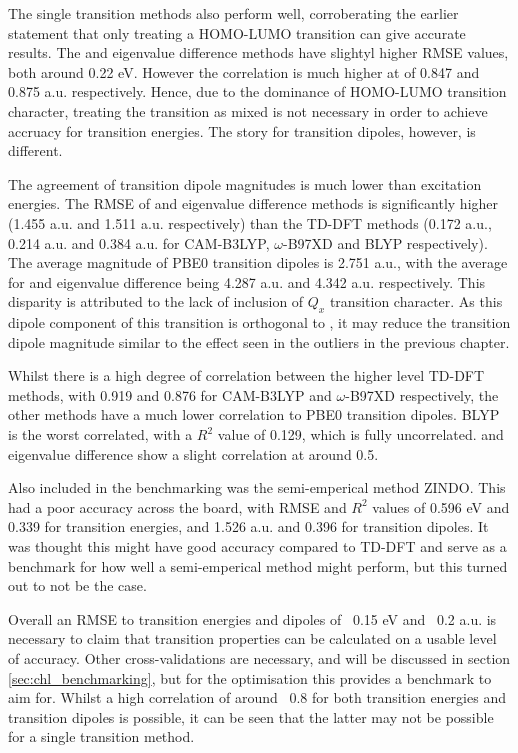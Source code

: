 The single transition methods also perform well, corroberating the earlier statement
that only treating a HOMO-LUMO transition can give accurate results. The \dscf and
eigenvalue difference methods have slightyl higher RMSE values, both around 0.22 eV.
However the correlation is much higher at of 0.847 and 0.875 a.u. respectively.
Hence, due to the dominance of HOMO-LUMO transition character, treating the transition
as mixed is not necessary in order to achieve accruacy for transition energies. 
The story for transition dipoles, however, is different.

The agreement of transition dipole magnitudes is much lower than excitation energies.
The RMSE of \dscf and eigenvalue difference methods is significantly higher (1.455
a.u. and 1.511 a.u. respectively) than the TD-DFT methods (0.172 a.u., 0.214 a.u.
and 0.384 a.u. for CAM-B3LYP, $\omega$-B97XD and BLYP respectively). The average
magnitude of PBE0 transition dipoles is 2.751 a.u., with the average for \dscf and 
eigenvalue difference being 4.287 a.u. and 4.342 a.u. respectively. This disparity
is attributed to the lack of inclusion of $Q_x$ transition character. As this dipole
component of this transition is orthogonal to \Qy, it may reduce the transition 
dipole magnitude similar to the effect seen in the outliers in the previous chapter.

Whilst there is a high degree of correlation between the higher level TD-DFT methods,
with 0.919 and 0.876 for CAM-B3LYP and $\omega$-B97XD respectively, the other methods
have a much lower correlation to PBE0 transition dipoles. BLYP is the worst correlated,
with a $R^2$ value of 0.129, which is fully uncorrelated. \dscf and eigenvalue difference
show a slight correlation at around 0.5.

Also included in the benchmarking was the semi-emperical method ZINDO. This had a
poor accuracy across the board, with RMSE and $R^2$ values of 0.596 eV and 0.339
for transition energies, and 1.526 a.u. and 0.396 for transition dipoles. It was
thought this might have good accuracy compared to TD-DFT and serve as a benchmark
for how well a semi-emperical method might perform, but this turned out to not be
the case.

Overall an RMSE to transition energies and dipoles of ~0.15 eV and ~0.2 a.u. is 
necessary to claim that transition properties can be calculated on a usable level 
of accuracy. Other cross-validations are necessary, and will be discussed in section
\ref{sec:chl_benchmarking}, but for the optimisation this provides a benchmark to 
aim for. Whilst a high correlation of around ~0.8 for both transition energies and
transition dipoles is possible, it can be seen that the latter may not be possible
for a single transition method.

